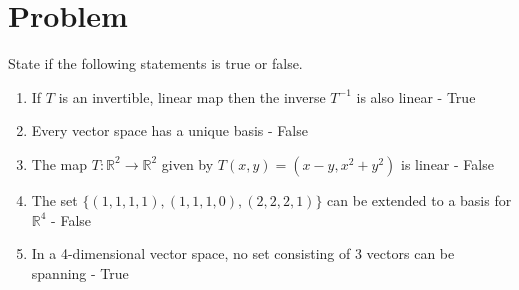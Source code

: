 \documentclass[12pt, a4paper]{article}
\begin{document}
	\section{Problem}
		State if the following statements is true or false.
		\begin{enumerate}
			\item If $T$ is an invertible, linear map then the inverse $T^{-1}$ is also linear - True
			\item Every vector space has a unique basis - False
			\item The map $T:\mathbb{R}^2\rightarrow \mathbb{R}^2$ given by $T(x,y)=(x-y,x^2+y^2)$ is linear - False
			\item The set $\{(1,1,1,1),(1,1,1,0),(2,2,2,1)\}$ can be extended to a basis for $\mathbb{R}^4$ - False
			\item In a 4-dimensional vector space, no set consisting of 3 vectors can be spanning - True
		\end{enumerate}
\end{document}
